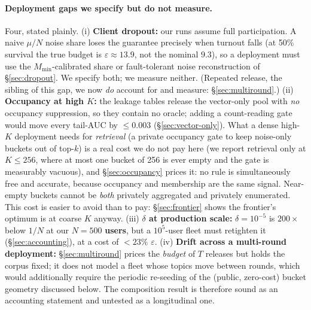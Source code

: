 \documentclass[pdflatex,sn-mathphys-num,12pt]{sn-jnl}
\theoremstyle{thmstyleone}%
\theoremstyle{thmstyletwo}%
\theoremstyle{thmstylethree}%
\newcommand{\eps}{\varepsilon}
\newcommand{\secref}[1]{\S\ref{#1}}
\begin{document}
\paragraph{Deployment gaps we specify but do not measure.} Four, stated plainly.
(i) \textbf{Client dropout:} our runs assume full participation. A naive $\mu/N$ noise share loses
the guarantee precisely when turnout falls (at 50\% survival the true budget is $\eps \approx 13.9$,
not the nominal $9.3$), so a deployment must use the $M_{\min}$-calibrated share or fault-tolerant
noise reconstruction of \secref{sec:dropout}. We specify both; we measure neither. (Repeated release,
the sibling of this gap, we now \emph{do} account for and measure: \secref{sec:multiround}.)
(ii) \textbf{Occupancy at high $K$:} the leakage tables release the vector-only pool with \emph{no}
occupancy suppression, so they contain no oracle; adding a count-reading gate would move every
tail-AUC by $\leq 0.003$ (\secref{sec:vector-only}). What a dense high-$K$ deployment needs for
\emph{retrieval} (a private occupancy gate to keep noise-only buckets out of top-$k$) is a real
cost we do not pay here (we report retrieval only at $K \leq 256$, where at most one bucket of
256 is ever empty and the gate is measurably vacuous), and
\secref{sec:occupancy} prices it: no rule is simultaneously free and accurate, because occupancy and
membership are the same signal. Near-empty buckets cannot be \emph{both} privately aggregated and
privately enumerated. This cost is easier to avoid than to pay:
\secref{sec:frontier} shows the frontier's optimum is at coarse $K$ anyway.
(iii) \textbf{$\delta$ at production scale:} $\delta = 10^{-5}$ is $200\times$ below $1/N$ at our
$N = 500$ \textbf{users}, but a $10^{5}$-user fleet must retighten it (\secref{sec:accounting}), at a
cost of $< 23\%$ $\eps$.
(iv) \textbf{Drift across a multi-round deployment:} \secref{sec:multiround} prices the \emph{budget}
of $T$ releases but holds the corpus fixed; it does not model a fleet whose topics move between
rounds, which would additionally require the periodic re-seeding of the (public, zero-cost) bucket
geometry discussed below. The composition result is therefore sound as an accounting statement and
untested as a longitudinal one.
\end{document}
